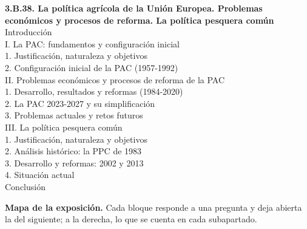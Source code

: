 \documentclass[11pt]{article}
\begin{document}
\begin{esquema}[unbreakable]
\textbf{3.B.38. La política agrícola de la Unión Europea. Problemas económicos y procesos de reforma. La política pesquera común}\\[2pt]
Introducción\\
I. La PAC: fundamentos y configuración inicial\\
\hspace*{1.5em}1. Justificación, naturaleza y objetivos\\
\hspace*{1.5em}2. Configuración inicial de la PAC (1957-1992)\\
II. Problemas económicos y procesos de reforma de la PAC\\
\hspace*{1.5em}1. Desarrollo, resultados y reformas (1984-2020)\\
\hspace*{1.5em}2. La PAC 2023-2027 y su simplificación\\
\hspace*{1.5em}3. Problemas actuales y retos futuros\\
III. La política pesquera común\\
\hspace*{1.5em}1. Justificación, naturaleza y objetivos\\
\hspace*{1.5em}2. Análisis histórico: la PPC de 1983\\
\hspace*{1.5em}3. Desarrollo y reformas: 2002 y 2013\\
\hspace*{1.5em}4. Situación actual\\
Conclusión
\end{esquema}

\begin{anotaciones}
\textbf{Mapa de la exposición.} Cada bloque responde a una pregunta y deja abierta la del siguiente; a la derecha, lo que se cuenta en cada subapartado.
\begin{infografiacaja}
\caption{Mapa del tema: la pregunta de cada bloque y el hilo que los une}\label{figu:mapa-tema}
\end{infografiacaja}
\end{anotaciones}
\end{document}
